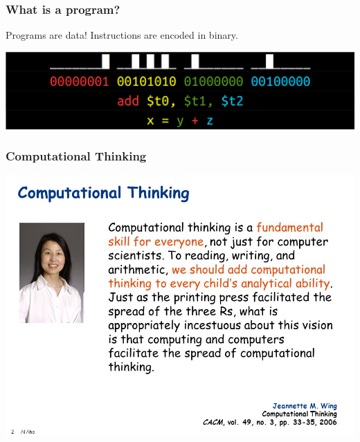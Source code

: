 \documentclass[11pt]{beamer}
\begin{document}
\begin{frame}
  \frametitle{What is a program?}
  \Enlarge

  \begin{itemize} \pause
    \myitem Programs are data! \pause
	\myitem Instructions are encoded in binary.
  \end{itemize}
  \includegraphics[width=\textwidth]{./img/assembler-4.png}
\end{frame}


\begin{frame}
	\frametitle{Computational Thinking}
	\Enlarge
	
	\includegraphics[width=\textwidth]{./img/wing.jpg}
\end{frame}

\end{document}
